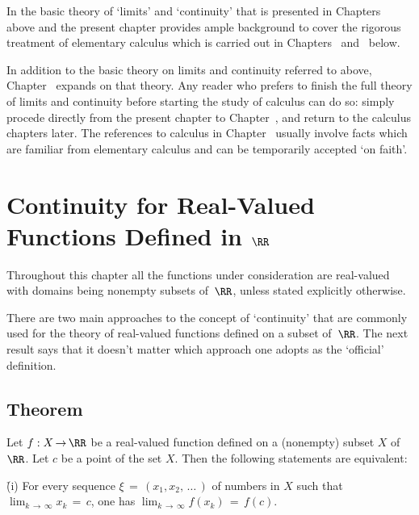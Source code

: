         In {\ThisText} the basic theory of `limits' and `continuity' that is presented in Chapters~ above and the present chapter provides ample background
    to cover the rigorous treatment of  elementary calculus which is carried out in Chapters~ and~ below.

        In addition to the basic theory on limits and continuity referred to above, Chapter~ expands on that theory.
        Any reader who prefers to finish the full theory of limits and continuity before starting the study of calculus can do so:
    simply procede directly from the present chapter to Chapter~, and return to the calculus chapters later.
    The references to calculus in Chapter~ usually involve facts which are familiar from elementary calculus and can be temporarily accepted `on faith'.

\VV

                \section{{\bf Continuity for Real-Valued Functions Defined in ${\RR}$}}
                \label{SectD20}


\VV

        Throughout this chapter all the functions under consideration are real-valued
with domains being nonempty subsets of~${\RR}$, unless stated explicitly otherwise.


        There are two main approaches to the concept of `continuity' that are commonly used for the theory of
    real-valued functions defined on a subset of~${\RR}$. The next result says that it doesn't matter which approach one adopts as the `official' definition.

\V

            \subsection{\small{\bf Theorem}}
            \label{ThmD20.20}

        Let $f:X \,{\rightarrow}\, {\RR}$ be a real-valued function defined on a (nonempty) subset $X$ of ${\RR}$.
    Let $c$ be a point of the set $X$. Then the following statements are equivalent:

\V

        \h (i) For every sequence ${\xi} \,=\, (x_{1},x_{2},\,{\ldots}\,)$ of numbers in $X$ such that $\lim_{k \,{\rightarrow}\, {\infty}} x_{k} \,=\, c$,
    one has $\lim_{k \,{\rightarrow}\, {\infty}} f(x_{k}) \,=\, f(c)$.

